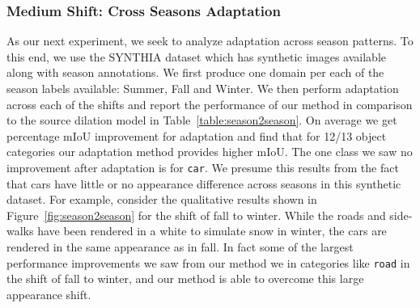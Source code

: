 \documentclass[10pt,twocolumn,letterpaper]{article}
\begin{document}
 \subsubsection{Medium Shift: Cross Seasons Adaptation}
As our next experiment, we seek to analyze adaptation across season patterns. To this end, we use the SYNTHIA dataset which has synthetic images available along with season annotations. We first produce one domain per each of the season labels available: Summer, Fall and Winter. We then perform adaptation across each of the  shifts and report the performance of our method in comparison to the source dilation model in Table~\ref{table:season2season}. On average we get  percentage mIoU improvement for  adaptation and find that for 12/13 object categories our adaptation method provides higher mIoU. The one class we saw no improvement after adaptation is for \texttt{car}. We presume this results from the fact that cars have little or no appearance difference across seasons in this synthetic dataset. For example, consider the qualitative results shown in Figure~\ref{fig:season2season} for the shift of fall to winter. While the roads and side-walks have been rendered in a white to simulate snow in winter, the cars are rendered in the same appearance as in fall. In fact some of the largest performance improvements we saw from our method we in categories like \texttt{road} in the shift of fall to winter, and our method is able to overcome this large appearance shift. 
\end{document}
